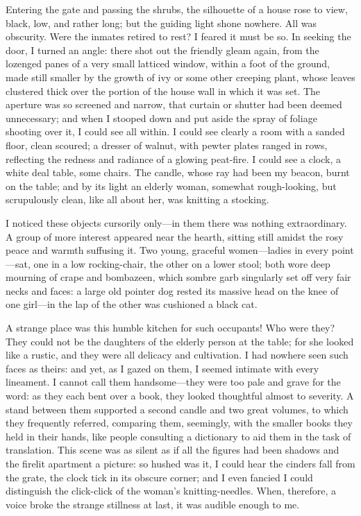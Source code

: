 Entering the gate and passing the shrubs, the silhouette of a house rose
to view, black, low, and rather long; but the guiding light shone
nowhere. All was obscurity. Were the inmates retired to rest? I
feared it must be so. In seeking the door, I turned an angle: there
shot out the friendly gleam again, from the lozenged panes of a very
small latticed window, within a foot of the ground, made still smaller
by the growth of ivy or some other creeping plant, whose leaves
clustered thick over the portion of the house wall in which it was set. 
The aperture was so screened and narrow, that curtain or shutter had
been deemed unnecessary; and when I stooped down and put aside the spray
of foliage shooting over it, I could see all within. I could see
clearly a room with a sanded floor, clean scoured; a dresser of walnut,
with pewter plates ranged in rows, reflecting the redness and radiance
of a glowing peat-fire. I could see a clock, a white deal table, some
chairs. The candle, whose ray had been my beacon, burnt on the table;
and by its light an elderly woman, somewhat rough-looking, but
scrupulously clean, like all about her, was knitting a stocking.

I noticed these objects cursorily only---in them there was nothing
extraordinary. A group of more interest appeared near the hearth,
sitting still amidst the rosy peace and warmth suffusing it. Two young,
graceful women---ladies in every point---sat, one in a low
rocking-chair, the other on a lower stool; both wore deep mourning of
crape and bombazeen, which sombre garb singularly set off very fair
necks and faces: a large old pointer dog rested its massive head on the
knee of one girl---in the lap of the other was cushioned a black cat.

A strange place was this humble kitchen for such occupants! Who were
they? They could not be the daughters of the elderly person at the
table; for she looked like a rustic, and they were all delicacy and
cultivation. I had nowhere seen such faces as theirs: and yet, as I
gazed on them, I seemed intimate with every lineament. I cannot call
them handsome---they were too pale and grave for the word: as they each
bent over a book, they looked thoughtful almost to severity. A stand
between them supported a second candle and two great volumes, to which
they frequently referred, comparing them, seemingly, with the smaller
books they held in their hands, like people consulting a dictionary to
aid them in the task of translation. This scene was as silent as if all
the figures had been shadows and the firelit apartment a picture: so
hushed was it, I could hear the cinders fall from the grate, the clock
tick in its obscure corner; and I even fancied I could distinguish the
click-click of the woman's knitting-needles. When, therefore, a voice
broke the strange stillness at last, it was audible enough to me.

